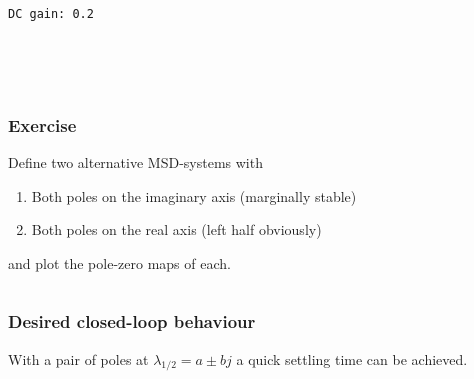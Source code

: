 \documentclass[11pt,a4paper, d]{scrartcl}
\makeatletter
\providecommand{\tightlist}{%
      \setlength{\itemsep}{0pt}\setlength{\parskip}{0pt}}
\newcommand{\boxspacing}{\kern\kvtcb@left@rule\kern\kvtcb@boxsep}
\newcommand{\prompt}[4]{
        {\ttfamily\llap{{\color{#2}[#3]:\hspace{3pt}#4}}\vspace{-\baselineskip}}
    }
\makeatother
\begin{document}
    \begin{Verbatim}[commandchars=\\\{\}]
DC gain: 0.2
    \end{Verbatim}

    \begin{center}
    \end{center}
    { \hspace*{\fill} \\}
    
    \begin{center}
    \end{center}
    { \hspace*{\fill} \\}
    
    \hypertarget{exercise}{%
\subsubsection{Exercise}\label{exercise}}

Define two alternative MSD-systems with

\begin{enumerate}
\def\labelenumi{\arabic{enumi}.}
\tightlist
\item
  Both poles on the imaginary axis (marginally stable)
\item
  Both poles on the real axis (left half obviously)
\end{enumerate}

and plot the pole-zero maps of each.

    \begin{tcolorbox}[breakable, size=fbox, boxrule=1pt, pad at break*=1mm,colback=cellbackground, colframe=cellborder]
\prompt{In}{incolor}{ }{\boxspacing}
\begin{Verbatim}[commandchars=\\\{\}]

\end{Verbatim}
\end{tcolorbox}

    \hypertarget{desired-closed-loop-behaviour}{%
\subsubsection{Desired closed-loop
behaviour}\label{desired-closed-loop-behaviour}}

With a pair of poles at \(\lambda_{1/2} = a\pm b j\) a quick settling
time can be achieved.
\end{document}
